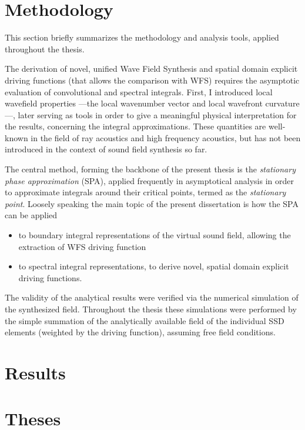 \documentclass[10pt,twoside]{article}
\theoremstyle{thesisgroupstyle}
\begin{document}
\section{Methodology}

This section briefly summarizes the methodology and analysis tools, applied throughout the thesis.

The derivation of novel, unified Wave Field Synthesis and spatial domain explicit driving functions (that allows the comparison with WFS) requires the asymptotic evaluation of convolutional and spectral integrals.
First, I introduced local wavefield properties ---the local wavenumber vector and local wavefront curvature---, later serving as tools in order to give a meaningful physical interpretation for the results, concerning the integral approximations.
These quantities are well-known in the field of ray acoustics and high frequency acoustics, but has not been introduced in the context of sound field synthesis so far.

The central method, forming the backbone of the present thesis is the \emph{stationary phase approximation} (SPA), applied frequently in asymptotical analysis in order to approximate integrals around their critical points, termed as the \emph{stationary point}.
Loosely speaking the main topic of the present dissertation is how the SPA can be applied 
\begin{itemize}
\item to boundary integral representations of the virtual sound field, allowing the extraction of WFS driving function 
\item to spectral integral representations, to derive novel, spatial domain explicit driving functions.
\end{itemize}
The validity of the analytical results were verified via the numerical simulation of the synthesized field.
Throughout the thesis these simulations were performed by the simple summation of the analytically available field of the individual SSD elements (weighted by the driving function), assuming free field conditions.

\section{Results}

\clearpage	
\section{Theses}
\end{document}
